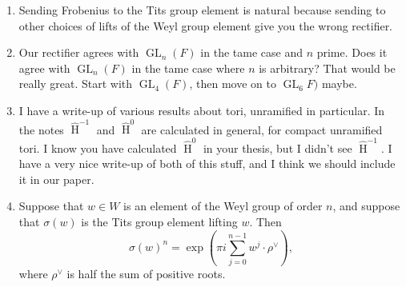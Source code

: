 \documentclass{article}
\DeclareMathOperator{\HH}{H}
\DeclareMathOperator{\GL}{GL}
\newcommand{\HT}[1]{\widehat{\HH}^{#1}}
\begin{document}
\begin{enumerate}
\item Sending Frobenius to the Tits group element is natural because sending to other choices of lifts of the Weyl group element give you the wrong rectifier.

\item Our rectifier agrees with $\GL_n(F)$ in the tame case and $n$ prime.  Does it agree with $\GL_n(F)$ in the tame case where $n$ is arbitrary?  That would be really great.  Start with $\GL_4(F)$, then move on to $\GL_6F)$ maybe.

\item I have a write-up of various results about tori, unramified in particular.  In the notes $\HT{-1}$ and $\HT{0}$ are calculated in general, for compact unramified tori.  I know you have calculated $\HT{0}$ in your thesis, but I didn't see $\HT{-1}$.  I have a very nice write-up of both of this stuff, and I think we should include it in our paper.

\item Suppose that $w \in W$ is an element of the Weyl group of order $n$, and suppose that $\sigma(w)$ is the Tits group element lifting $w$.  Then
$$\sigma(w)^n = \exp\left(\pi i \sum_{j=0}^{n-1} w^j \cdot \rho^\vee\right),$$
where $\rho^{\vee}$ is half the sum of positive roots.

\end{enumerate}
\end{document}
